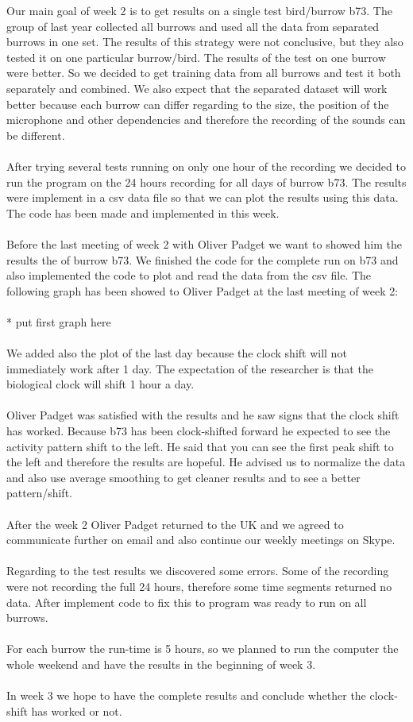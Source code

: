 \documentclass[a4paper]{article}
\begin{document}
Our main goal of week 2 is to get results on a single test bird/burrow b73. The group of last year collected all burrows and used all the data from separated burrows in one set.  The results of this strategy were not conclusive, but they also tested it on one particular burrow/bird. The results of the test on one burrow were better. So we decided to get training data from all burrows and test it both separately and combined. We also expect that the separated dataset will work better because each burrow can differ regarding to the size, the position of the microphone and other dependencies and therefore the recording of the sounds can be different.\\\\
After trying several tests running on only one hour of the recording we decided to run the program on the 24 hours recording for all days of burrow b73. The results were implement in a csv data file so that we can plot the results using this data. The code has been made and implemented in this week. \\\\
Before the last meeting of week 2 with Oliver Padget we want to showed him the results the of burrow b73. We finished the code for the complete run on b73 and also implemented the code to plot and read the data from the csv file. The following graph has been showed  to Oliver Padget at the last meeting of week 2:\\\\
* put first graph here\\\\
We added also the plot of the last day because the clock shift will not immediately work after 1 day. The expectation of the researcher is that the biological clock will shift 1 hour a day. \\\\
Oliver Padget was satisfied with the results and he saw signs that the clock shift has worked. Because b73 has been clock-shifted forward he expected to see the activity pattern shift to the left. He said that you can see the first peak shift to the left and therefore the results are hopeful. He advised us to normalize the data and also use average smoothing to get cleaner results and to see a better pattern/shift.\\\\
After the week 2 Oliver Padget returned to the UK and we agreed to communicate further on email and also continue our weekly meetings on Skype.\\\\
Regarding to the test results we discovered some errors. Some of the recording were not recording the full 24 hours, therefore some time segments returned no data. After implement code to fix this to program was ready to run on all burrows.\\\\
For each burrow the run-time is 5 hours, so we planned to run the computer the whole weekend and have the results in the beginning of week 3.\\\\
In week 3 we hope to have the complete results and conclude whether the clock-shift has worked or not. 
\end{document}
